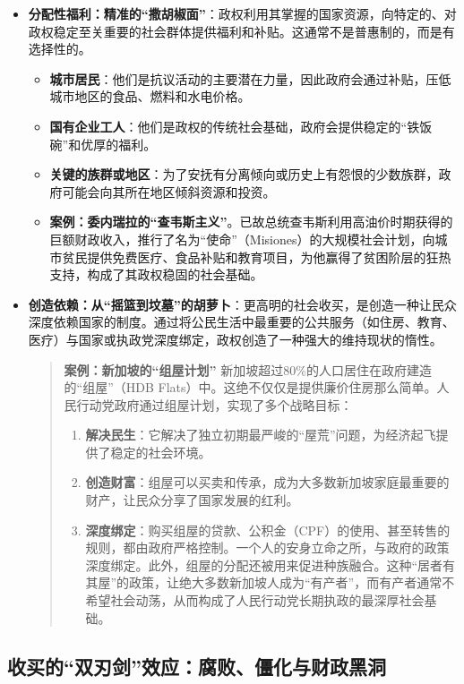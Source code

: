 \begin{itemize}
    \item \textbf{分配性福利：精准的“撒胡椒面”}：政权利用其掌握的国家资源，向特定的、对政权稳定至关重要的社会群体提供福利和补贴。这通常不是普惠制的，而是有选择性的。
    \begin{itemize}
        \item \textbf{城市居民}：他们是抗议活动的主要潜在力量，因此政府会通过补贴，压低城市地区的食品、燃料和水电价格。
        \item \textbf{国有企业工人}：他们是政权的传统社会基础，政府会提供稳定的“铁饭碗”和优厚的福利。
        \item \textbf{关键的族群或地区}：为了安抚有分离倾向或历史上有怨恨的少数族群，政府可能会向其所在地区倾斜资源和投资。
        \item \textbf{案例：委内瑞拉的“查韦斯主义”}。已故总统查韦斯利用高油价时期获得的巨额财政收入，推行了名为“使命”（Misiones）的大规模社会计划，向城市贫民提供免费医疗、食品补贴和教育项目，为他赢得了贫困阶层的狂热支持，构成了其政权稳固的社会基础。
    \end{itemize}
    \item \textbf{创造依赖：从“摇篮到坟墓”的胡萝卜}：更高明的社会收买，是创造一种让民众深度依赖国家的制度。通过将公民生活中最重要的公共服务（如住房、教育、医疗）与国家或执政党深度绑定，政权创造了一种强大的维持现状的惰性。
    \begin{quote}
    \textbf{案例：新加坡的“组屋计划”}
    新加坡超过80\%的人口居住在政府建造的“组屋”（HDB Flats）中。这绝不仅仅是提供廉价住房那么简单。人民行动党政府通过组屋计划，实现了多个战略目标：
    \begin{enumerate}
        \item \textbf{解决民生}：它解决了独立初期最严峻的“屋荒”问题，为经济起飞提供了稳定的社会环境。
        \item \textbf{创造财富}：组屋可以买卖和传承，成为大多数新加坡家庭最重要的财产，让民众分享了国家发展的红利。
        \item \textbf{深度绑定}：购买组屋的贷款、公积金（CPF）的使用、甚至转售的规则，都由政府严格控制。一个人的安身立命之所，与政府的政策深度绑定。此外，组屋的分配还被用来促进种族融合。这种“居者有其屋”的政策，让绝大多数新加坡人成为“有产者”，而有产者通常不希望社会动荡，从而构成了人民行动党长期执政的最深厚社会基础。
    \end{enumerate}
    \end{quote}
\end{itemize}

\subsection{收买的“双刃剑”效应：腐败、僵化与财政黑洞}

